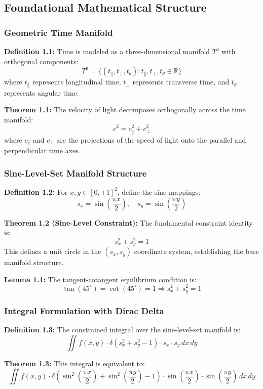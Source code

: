 ﻿\documentclass[12pt]{article}
\begin{document}
\subsection{Foundational Mathematical Structure}

\subsubsection{Geometric Time Manifold}
\textbf{Definition 1.1:} Time is modeled as a three-dimensional manifold $T^3$ with orthogonal components:
$$T^3 = \{(t_\parallel, t_\perp, t_\theta) : t_\parallel, t_\perp, t_\theta \in \mathbb{R}\}$$
where $t_\parallel$ represents longitudinal time, $t_\perp$ represents transverse time, and $t_\theta$ represents angular time.

\textbf{Theorem 1.1:} The velocity of light decomposes orthogonally across the time manifold:
$$c^2 = c_\parallel^2 + c_\perp^2$$
where $c_\parallel$ and $c_\perp$ are the projections of the speed of light onto the parallel and perpendicular time axes.

\subsubsection{Sine-Level-Set Manifold Structure}
\textbf{Definition 1.2:} For $x, y \in [0, \pm 1]^2$, define the sine mappings:
$$s_x = \sin\left(\frac{\pi x}{2}\right), \quad s_y = \sin\left(\frac{\pi y}{2}\right)$$

\textbf{Theorem 1.2 (Sine-Level Constraint):} The fundamental constraint identity is:
$$s_x^2 + s_y^2 = 1$$
This defines a unit circle in the $(s_x, s_y)$ coordinate system, establishing the base manifold structure.

\textbf{Lemma 1.1:} The tangent-cotangent equilibrium condition is:
$$\tan(45^\circ) = \cot(45^\circ) = 1 \Rightarrow s_x^2 + s_y^2 = 1$$

\subsubsection{Integral Formulation with Dirac Delta}
\textbf{Definition 1.3:} The constrained integral over the sine-level-set manifold is:
$$\iint f(x,y) \cdot \delta(s_x^2 + s_y^2 - 1) \cdot s_x \cdot s_y \, dx \, dy$$

\textbf{Theorem 1.3:} This integral is equivalent to:
$$\iint f(x,y) \cdot \delta\left(\sin^2\left(\frac{\pi x}{2}\right) + \sin^2\left(\frac{\pi y}{2}\right) - 1\right) \cdot \sin\left(\frac{\pi x}{2}\right) \cdot \sin\left(\frac{\pi y}{2}\right) \, dx \, dy$$
\end{document}
